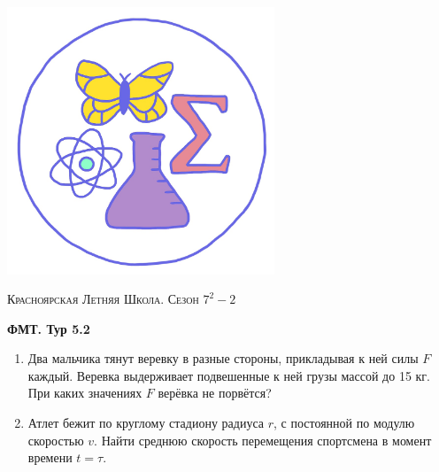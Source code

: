 \colorbox{white!10!}{
    \begin{minipage}{0.2\textwidth}
       \begin{flushleft}
        \includegraphics[width = 0.6\textwidth]{Эмблема.png}
       \end{flushleft}
    \end{minipage}
    \begin{minipage}[t]{0.7 \textwidth}
        \begin{center}
            {\huge \textsc{Красноярская Летняя Школа. Сезон $7^2 - 2$}}
            \vspace{0.25cm}
            
            { \huge \textbf{ФМТ. Тур 5.2}}
        \end{center}
        \vspace{0.05cm}
    \end{minipage}
}

\begin{enumerate}
    \item Два мальчика тянут веревку в разные стороны, прикладывая к ней силы $F$ каждый. Веревка выдерживает подвешенные к ней грузы массой до 15 кг. При каких значениях $F$ верёвка не порвётся?

    \item Атлет бежит по круглому стадиону радиуса $r$, с постоянной по модулю скоростью $v$. Найти среднюю скорость перемещения спортсмена в момент времени $t = \tau$.
    
\end{enumerate}